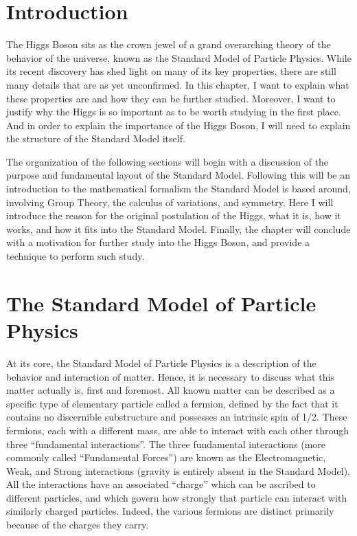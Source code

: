 \section{Introduction}

    The Higgs Boson sits as the crown jewel of a grand overarching theory of the behavior of the universe,
        known as the Standard Model of Particle Physics.
    While its recent discovery has shed light on many of its key properties,
        there are still many details that are as yet unconfirmed.
    In this chapter, I want to explain what these properties are and how they can be further studied.
    Moreover, I want to justify why the Higgs is so important as to be worth studying in the first place.
    And in order to explain the importance of the Higgs Boson,
        I will need to explain the structure of the Standard Model itself.

    The organization of the following sections will begin with a discussion of the purpose and fundamental layout of the Standard Model.
    Following this will be an introduction to the mathematical formalism the Standard Model is based around,
        involving Group Theory, the calculus of variations, and symmetry.
    Here I will introduce the reason for the original postulation of the Higgs, what it is, how it works, and how it fits into the Standard Model.
    Finally, the chapter will conclude with a motivation for further study into the Higgs Boson, and provide a technique to perform such study.


\section{The Standard Model of Particle Physics}\label{sec:standard_model}
    
    At its core, the Standard Model of Particle Physics is a description of the behavior and interaction of matter.
    Hence, it is necessary to discuss what this matter actually is, first and foremost.
    All known matter can be described as a specific type of elementary particle called a fermion,
        defined by the fact that it contains no discernible substructure and possesses an intrinsic spin of 1/2.
    These fermions, each with a different mass, are able to interact with each other through three ``fundamental interactions''.
    The three fundamental interactions (more commonly called ``Fundamental Forces'') are known as
        the Electromagnetic, Weak, and Strong interactions (gravity is entirely absent in the Standard Model).
    All the interactions have an associated ``charge'' which can be ascribed to different particles,
        and which govern how strongly that particle can interact with similarly charged particles.
    Indeed, the various fermions are distinct primarily because of the charges they carry.

